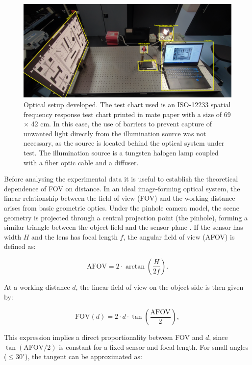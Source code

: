 \begin{figure}[H]
        \centering
        \includegraphics[width=0.98\linewidth]{Figures/C3/MTF_montaje.pdf}
        \caption{Optical setup developed. The test chart used is an ISO-12233 spatial frequency response test chart printed in mate paper with a size of 69 $\times$ 42 cm. In this case, the use of barriers to prevent capture of unwanted light directly from the illumination source was not necessary, as the source is located behind the optical system under test. The illumination source is a tungsten halogen lamp coupled with a fiber optic cable and a diffuser.}
        \label{fig:MTF_FOV_montage}
\end{figure}


\noindent
Before analysing the experimental data it is useful to establish the theoretical dependence of FOV on distance. In an ideal image-forming optical system, the linear relationship between the field of view (FOV) and the working distance arises from basic geometric optics. Under the pinhole camera model, the scene geometry is projected through a central projection point (the pinhole), forming a similar triangle between the object field and the sensor plane \cite{Hecht2002Optics,StanfordPinhole}. If the sensor has width $H$ and the lens has focal length $f$, the angular field of view (AFOV) is defined as:

\begin{equation}
\text{AFOV} = 2 \cdot \arctan\left(\frac{H}{2f}\right).
\end{equation}

\noindent
At a working distance $d$, the linear field of view on the object side is then given by:

\begin{equation}
\text{FOV}(d) = 2 \cdot d \cdot \tan\left(\frac{\text{AFOV}}{2}\right),
\label{eq:fov_linear}
\end{equation}

\noindent
This expression implies a direct proportionality between FOV and $d$, since $\tan(\text{AFOV}/2)$ is constant for a fixed sensor and focal length. For small angles ($\leq 30^\circ$), the tangent can be approximated as:


